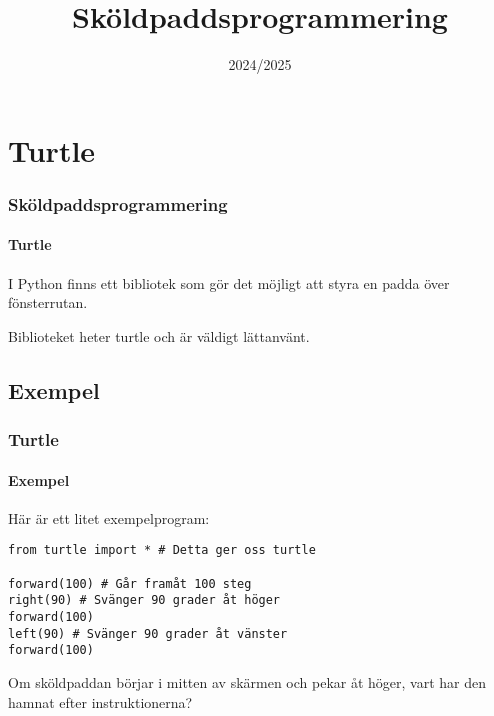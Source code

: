 \documentclass[aspectratio=169]{beamer}
\begin{document}


\title{Sköldpaddsprogrammering}
\date{2024/2025}

\maketitle{}

\section{Turtle}

\begin{frame}
	\frametitle{Sköldpaddsprogrammering}
	\framesubtitle{Turtle}
	
	I Python finns ett bibliotek som gör det möjligt att styra en padda över fönsterrutan.
	
	Biblioteket heter turtle och är väldigt lättanvänt.

\end{frame}

\subsection{Exempel}

\begin{frame}[fragile]
	\frametitle{Turtle}
	\framesubtitle{Exempel}
	
	Här är ett litet exempelprogram:
	
	\begin{lstlisting}
from turtle import * # Detta ger oss turtle

forward(100) # Går framåt 100 steg
right(90) # Svänger 90 grader åt höger
forward(100)
left(90) # Svänger 90 grader åt vänster
forward(100)
	\end{lstlisting}
	
	Om sköldpaddan börjar i mitten av skärmen och pekar åt höger, vart har den hamnat efter instruktionerna?
	
\end{frame}
\end{document}
